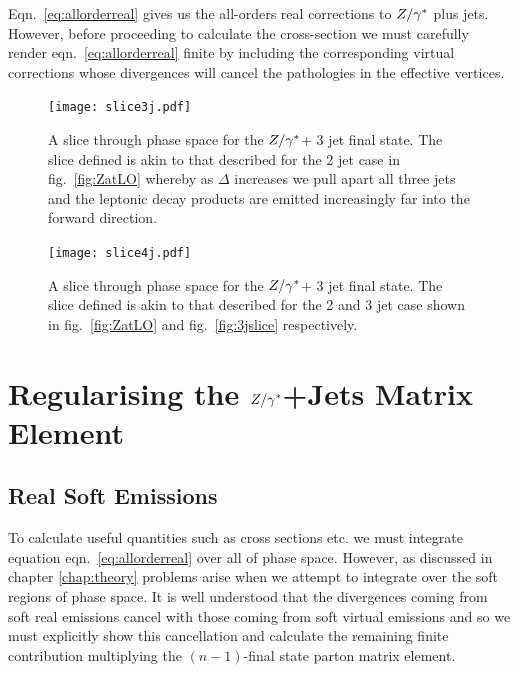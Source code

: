 		Eqn.~\eqref{eq:allorderreal} gives us the all-orders real corrections to $Z/\gamma^*$ plus jets.
		However, before proceeding to calculate the cross-section we must carefully render eqn.~\eqref{eq:allorderreal}
		finite by including the corresponding virtual corrections whose divergences will cancel the pathologies
		in the effective vertices.

		\begin{figure}[hbt]
		  \begin{center}
		    \texttt{[image: slice3j.pdf]}
		    \caption{A slice through phase space for the $Z/\gamma^*$+ 3 jet final state.  The slice defined is
		    akin to that described for the 2 jet case in fig.~\eqref{fig:ZatLO} whereby as $\Delta$ increases
		    we pull apart all three jets and the leptonic decay products are emitted increasingly far into
		    the forward direction.}
		    \label{fig:3jslice}
		  \end{center}
		\end{figure}

		\begin{figure}[hbt]
		  \begin{center}
		    \texttt{[image: slice4j.pdf]}
		    \caption{A slice through phase space for the $Z/\gamma^*$+ 3 jet final state.  The slice defined is
		    akin to that described for the 2 and 3 jet case shown in fig.~\eqref{fig:ZatLO} and
		    fig.~\eqref{fig:3jslice} respectively.}
		    \label{fig:4jslice}
		  \end{center}
		\end{figure}

\section{Regularising the $Z/\gamma^*$+Jets Matrix Element}
	\label{sec:regularising}

	\subsection{Real Soft Emissions}
		\label{sub:softEmissions}

		To calculate useful quantities such as cross sections etc. we must integrate equation
		eqn.~\eqref{eq:allorderreal} over all of phase space.  However, as discussed in chapter \ref{chap:theory}
		problems arise when we attempt to integrate over the soft regions of phase space.  It is well understood
		that the divergences coming from soft real emissions cancel with those coming from soft
		virtual emissions and so we must explicitly show this cancellation and calculate the remaining
		finite contribution multiplying the $(n-1)$-final state parton matrix element.

